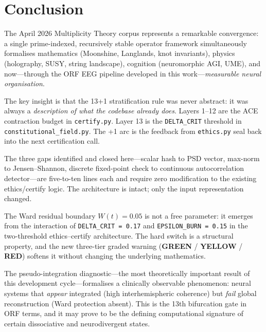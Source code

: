 \documentclass[12pt,a4paper]{article}
\theoremstyle{plain}
\theoremstyle{definition}
\begin{document}
\section{Conclusion}
\label{sec:conclusion}

The April 2026 Multiplicity Theory corpus represents a remarkable convergence: a single
prime-indexed, recursively stable operator framework simultaneously formalises
mathematics (Moonshine, Langlands, knot invariants), physics (holography, SUSY, string
landscape), cognition (neuromorphic AGI, UME), and now---through the ORF EEG pipeline
developed in this work---\emph{measurable neural organisation}.

The key insight is that the 13+1 stratification rule was never abstract: it was always
a \emph{description of what the codebase already does}.  Layers 1--12 are the ACE
contraction budget in \texttt{certify.py}.  Layer 13 is the \texttt{DELTA\_CRIT}
threshold in \texttt{constitutional\_field.py}.  The +1 arc is the feedback from
\texttt{ethics.py} seal back into the next certification call.

The three gaps identified and closed here---scalar hash to PSD vector, max-norm to
Jensen--Shannon, discrete fixed-point check to continuous autocorrelation detector---are
five-to-ten lines each and require zero modification to the existing ethics/certify
logic.  The architecture is intact; only the input representation changed.

The Ward residual boundary $W(t) = 0.05$ is not a free parameter: it emerges from the
interaction of \texttt{DELTA\_CRIT = 0.17} and \texttt{EPSILON\_BURN = 0.15} in the
two-threshold ethics--certify architecture.  The hard switch is a structural property,
and the new three-tier graded warning (\textcolor{wardgreen}{\textbf{GREEN}} / 
\textcolor{wardyellow}{\textbf{YELLOW}} / \textcolor{wardred}{\textbf{RED}}) softens
it without changing the underlying mathematics.

The pseudo-integration diagnostic---the most theoretically important result of this
development cycle---formalises a clinically observable phenomenon: neural systems that
\emph{appear} integrated (high interhemispheric coherence) but \emph{fail} global
reconstruction (Ward protection absent).  This is the 13th bifurcation gate in ORF
terms, and it may prove to be the defining computational signature of certain
dissociative and neurodivergent states.
\end{document}
